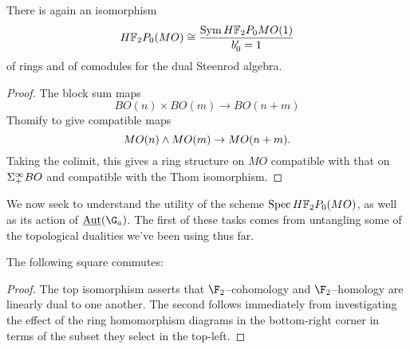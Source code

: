 \begin{corollary}\label{HF2MOisFree}
There is again an isomorphism \[\HFtwo P_0(MO) \cong \frac{\Sym \HFtwo P_0 MO(1)}{b'_0 = 1}\] of rings and of comodules for the dual Steenrod algebra.
\end{corollary}
\begin{proof}
The block sum maps \[BO(n) \times BO(m) \to BO(n+m)\] Thomify to give compatible maps \[MO(n) \wedge MO(m) \to MO(n+m).\]  Taking the colimit, this gives a ring structure on \(MO\) compatible with that on \(\Sigma^\infty_+ BO\) and compatible with the Thom isomorphism.
\end{proof}

We now seek to understand the utility of the scheme \(\Spec \HFtwo P_0(MO)\), as well as its action of \(\InternalAut(\G_a)\).  The first of these tasks comes from untangling some of the topological dualities we've been using thus far.
\begin{lemma}\label{DetectingMORingMapsInHomotopy}
The following square commutes:
\begin{center}
\end{center}
\end{lemma}
\begin{proof}
The top isomorphism asserts that \(\F_2\)--cohomology and \(\F_2\)--homology are linearly dual to one another.  The second follows immediately from investigating the effect of the ring homomorphism diagrams in the bottom-right corner in terms of the subset they select in the top-left.
\end{proof}

